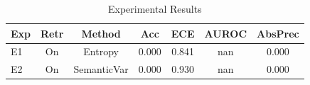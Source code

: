 \begin{table}[h]
\centering
\caption{Experimental Results}
\label{tab:results}
\begin{tabular}{lcccccc}
\hline
Exp & Retr & Method & Acc & ECE & AUROC & AbsPrec \\
\hline
E1 & On & Entropy & 0.000 & 0.841 & nan & 0.000 \\
E2 & On & SemanticVar & 0.000 & 0.930 & nan & 0.000 \\
\hline
\end{tabular}
\end{table}
